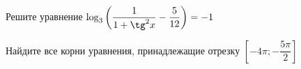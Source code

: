 \begin{ex}
	\begin{condition}
		\begin{enumcols}[label=\asbuk*)]
			\item Решите уравнение \( \log_3 {\left(\dfrac{1}{1+\tg^2 x} - \dfrac{5}{12}\right)} = -1 \)
			\item Найдите все корни уравнения, принадлежащие отрезку \( \left[-4\pi;-\dfrac{5\pi}{2}\right] \)
		\end{enumcols}
	\end{condition}
\end{ex}